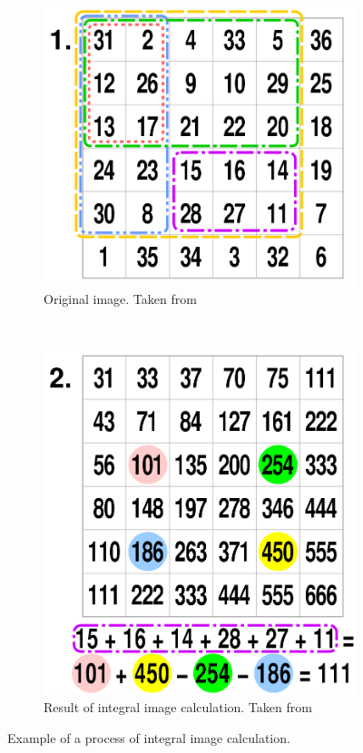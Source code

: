 \documentclass[11pt]{report} %
\begin{document}
\begin{figure}[H]
	\centering
	\begin{subfigure}{.5\textwidth}
		\centering
		\includegraphics[width=0.7\linewidth]{assets/imgs/computer_vision/integral_image_calculation_part01.png}
		\caption{Original image. Taken from \citep{cite_integral_image_photo_wikipedia}}
		\label{fig_integral_image_part01}
	\end{subfigure}~
	\begin{subfigure}{.5\textwidth}
		\centering
		\includegraphics[width=0.55\linewidth]{assets/imgs/computer_vision/integral_image_calculation_part02.png}
		\caption{Result of integral image calculation. Taken from \citep{cite_integral_image_photo_wikipedia}}
		\label{fig_integral_image_part02}
	\end{subfigure}%
	\caption{Example of a process of integral image calculation.}
	\label{fig_integral_image_complete}
\end{figure}
\end{document}
